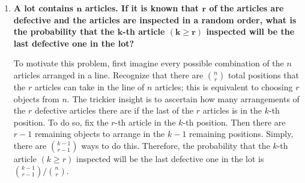 \documentclass[10pt, oneside]{article}
\begin{document}
\begin{enumerate}[label=2.\arabic*]
  $5! = \boxed{120}$ ways.
  
\item \begin{tcolorbox}[
  colback=Cerulean!5!white,
  colframe=Cerulean!75!black]
  \textbf{A lot contains $\bm{n}$ articles. If it is known that $\bm{r}$ of the articles are defective and the articles are inspected in a random order, what is the probability that the $\bm{k}$-th article $\bm{(k \geq r)}$ inspected will be the last defective one in the lot?}
  \end{tcolorbox}
  
  To motivate this problem, first imagine every possible combination of the $n$ articles arranged in a line. Recognize that there are $\binom{n}{r}$ total positions that the $r$ articles can take in the line of $n$ articles; this is equivalent to choosing $r$ objects from $n$. The trickier insight is to ascertain how many arrangements of the $r$ defective articles there are if the last of the $r$ articles is in the $k$-th position. To do so, fix the $r$-th article in the $k$-th position. Then there are $r-1$ remaining objects to arrange in the $k-1$ remaining positions. Simply, there are $\binom{k-1}{r-1}$ ways to do this. Therefore, the probability that the $k$-th article $(k \geq r)$ inspected will be the last defective one in the lot is $\boxed{\binom{k-1}{r-1} / \binom{n}{r}}$.
\end{enumerate}
\end{document}
